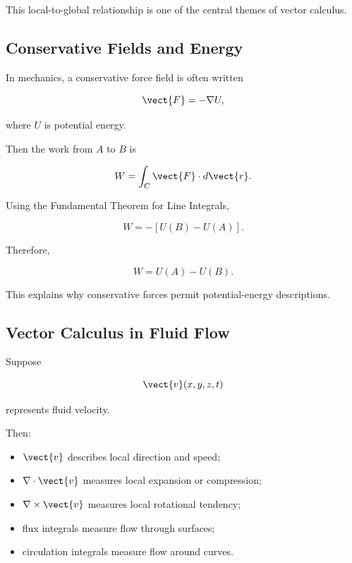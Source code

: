 This local-to-global relationship is one of the central themes of vector
calculus.

\subsection{Conservative Fields and Energy}
\label{subsec:conservative-fields-energy}

In mechanics, a conservative force field is often written

\[ \vect{F}=-\nabla U, \]

where \(U\) is potential energy.

Then the work from \(A\) to \(B\) is

\[ W=\int_C\vect{F}\cdot d\vect{r}. \]

Using the Fundamental Theorem for Line Integrals,

\[ W=-[U(B)-U(A)]. \]

Therefore,

\[ \boxed{W=U(A)-U(B).} \]

This explains why conservative forces permit potential-energy descriptions.

\subsection{Vector Calculus in Fluid Flow}
\label{subsec:vector-calculus-fluid-flow}

Suppose

\[ \vect{v}(x,y,z,t) \]

represents fluid velocity.

Then:

\begin{itemize}
    \item \(\vect{v}\) describes local direction and speed;
    \item \(\nabla\cdot\vect{v}\) measures local expansion or compression;
    \item \(\nabla\times\vect{v}\) measures local rotational tendency;
    \item flux integrals measure flow through surfaces;
    \item circulation integrals measure flow around curves.
\end{itemize}

